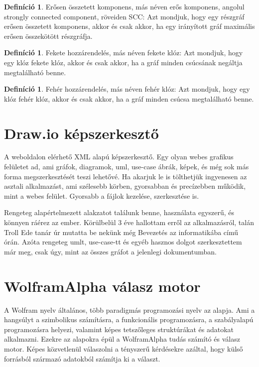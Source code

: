 \documentclass[
]{thesis-ekf}
\theoremstyle{definition}
\newtheorem{definicio}[tetel]{Definíció}
\theoremstyle{remark}
\begin{document}
	\begin{definicio}
		Erősen összetett komponens, más néven erős komponens, angolul strongly connected component, röveiden \textsc{SCC}: Azt mondjuk, hogy egy részgráf erősen összetett komponens, akkor és csak akkor, ha egy irányított gráf maximális erősen összekötött részgráfja. 
	\end{definicio}
	
	\begin{definicio}
		Fekete hozzárendelés, más néven fekete klóz: Azt mondjuk, hogy egy klóz fekete klóz, akkor és csak akkor, ha a gráf minden csúcsának negáltja megtalálható benne.
	\end{definicio}
	
	\begin{definicio}
		Fehér hozzárendelés, más néven fehér klóz: Azt mondjuk, hogy egy klóz fehér klóz, akkor és csak akkor, ha a gráf minden csúcsa megtalálható benne.
	\end{definicio}

 	\section{Draw.io képszerkesztő}

	A \cite{link-drawio} weboldalon elérhető \textsc{XML} alapú képszerkesztő. Egy olyan webes grafikus felületet ad, ami gráfok, diagramok, uml, use-case ábrák, képek, és még sok más forma megszerkesztését teszi lehetővé. Ha akarjuk le is tölthetjük ingyenesen az asztali alkalmazást, ami szélesebb körben, gyorsabban és precízebben működik, mint a webes felület. Gyorsabb a fájlok kezelése, szerkesztése is.
	
	Rengeteg alapértelmezett alakzatot találunk benne, használata egyszerű, és könnyen ráérez az ember. Körülbelül 3 éve hallottam erről az alkalmazásról, talán Troll Ede tanár úr mutatta be nekünk még Bevezetés az informatikába című órán. Azóta rengeteg umlt, use-case-tt és egyéb hasznos dolgot szerkesztettem már meg, csak úgy, mint az összes gráfot a jelenlegi dokumentumban.
	
	\section{WolframAlpha válasz motor}
	A Wolfram nyelv általános, több paradigmás programozási nyelv az alapja. Ami a hangsúlyt a szimbolikus számításra, a funkcionális programozásra, a szabályalapú programozásra helyezi, valamint képes tetszőleges struktúrákat és adatokat alkalmazni. Ezekre az alapokra épül a WolframAlpha tudás számító és válasz motor. Képes közvetlenül válaszolni a tényszerű kérdésekre azáltal, hogy külső forrásból származó adatokból számítja ki a választ.
	
\end{document}
